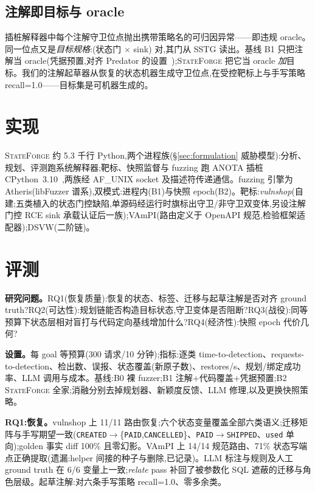 \documentclass[letterpaper,twocolumn,10pt]{article}
\newcommand{\sys}{\textsc{StateForge}}
\begin{document}
\subsection{注解即目标与 oracle}
\label{sec:annotations}
插桩解释器中每个注解守卫位点抛出携带策略名的可归因异常——即违规 oracle。同一位点又是\emph{目标规格}:(状态门 × sink) 对,其门从 SSTG 读出。基线 B1 只把注解当 oracle(凭据预置,对齐 Predator 的设置~\cite{predator});\sys{} 把它当 oracle \emph{加}目标。我们的注解起草器从恢复的状态机器生成守卫位点,在受控靶标上与手写策略 recall=1.0——目标集是可机器生成的。

\section{实现}
\label{sec:impl}
\sys{} 约 5.3 千行 Python,两个进程族(\S\ref{sec:formulation} 威胁模型):分析、规划、评测跑系统解释器;靶标、快照监督与 fuzzing 跑 ANOTA 插桩 CPython~3.10~\cite{anota},两族经 AF\_UNIX socket 及描述符传递通信。fuzzing 引擎为 Atheris(libFuzzer 谱系),双模式:进程内(B1)与快照 epoch(B2)。靶标:\emph{vulnshop}(自建;五类植入的状态门控缺陷,单源码经运行时旗标出守卫/非守卫双变体,另设注解门控 RCE sink 承载认证后一族);VAmPI(路由定义于 OpenAPI 规范,检验框架适配器);DSVW(二阶链)。

\section{评测}
\label{sec:eval}
\textbf{研究问题。}RQ1(恢复质量):恢复的状态、标签、迁移与起草注解是否对齐 ground truth?RQ2(可达性):规划链能否构造目标状态,守卫变体是否阻断?RQ3(战役):同等预算下状态层相对盲打与代码定向基线增加什么?RQ4(经济性):快照 epoch 代价几何?

\textbf{设置。}每 goal 等预算(300 请求/10 分钟);指标:逐类 time-to-detection、requests-to-detection、检出数、误报、状态覆盖(新原子数)、restores/s、规划/绑定成功率、LLM 调用与成本。基线:B0 裸 fuzzer;B1 注解+代码覆盖+凭据预置;B2 \sys{} 全家;消融分别去掉规划器、新颖度反馈、LLM 修理,以及更换快照策略。

\textbf{RQ1:恢复。}vulnshop 上 11/11 路由恢复;六个状态变量覆盖全部六类语义;迁移矩阵与手写期望一致(\texttt{CREATED}$\to$\{\texttt{PAID},\texttt{CANCELLED}\}、\texttt{PAID}$\to$\texttt{SHIPPED}、\texttt{used} 单向);golden 事实 diff 100\% 且零幻影。VAmPI 上 14/14 规范路由、71\% 状态写端点正确提取(遗漏:helper 间接的种子与删除,已记录)。LLM 标注与规则及人工 ground truth 在 6/6 变量上一致;\emph{relate} pass 补回了被参数化 SQL 遮蔽的迁移与角色层级。起草注解:对六条手写策略 recall=1.0、零多余类。
\end{document}

